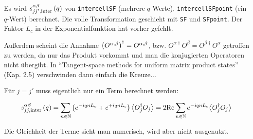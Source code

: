 \documentclass[12pt,paper=a4,BCOR=16mm]{article}
\begin{document}
Es wird $s^{\alpha\beta}_{jj',\text{inter}}\left(q\right)$ von \texttt{intercellSF} (mehrere $q$-Werte), \texttt{intercellSFpoint} (ein $q$-Wert) berechnet. Die volle Transformation geschieht mit \texttt{SF} und \texttt{SFpoint}. Der Faktor $L_c$ in der Exponentialfunktion hat vorher gefehlt.

Au{\ss}erdem scheint die Annahme $\left(O^{\alpha,\beta}\right)^{\dagger}=O^{\alpha,\beta}$, bzw. $O^{\alpha\dagger}O^{\beta} = O^{\beta\dagger}O^{\alpha}$ getroffen zu werden, da nur das Produkt vorkommt und man die konjugierten Operatoren nicht \"ubergibt. In ``Tangent-space methods for uniform matrix product states'' (Kap. 2.5) verschwinden dann einfach die Kreuze...

F\"ur $j=j'$ muss eigentlich nur ein Term berechnet werden:

\begin{equation}
s^{\alpha\beta}_{jj,\text{inter}}\left(q\right) = \sum_{n\in\mathbb{N}} \left(e^{-iqnL_c}+e^{+iqnL_c}\right) \big< O^{\dagger}_j O_j \big> = 2\text{Re} \sum_{n\in\mathbb{N}} e^{-iqnL_c} \big< O_j^{\dagger} O_j \big>
\end{equation}

Die Gleichheit der Terme sieht man numerisch, wird aber nicht ausgenutzt.




\end{document}
